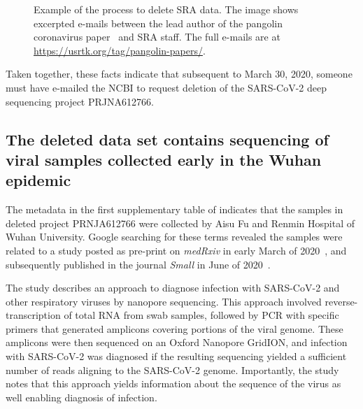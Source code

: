 \documentclass[9pt,twocolumn,twoside]{gsajnl_modified}
\begin{document}
\begin{figure}[]
\centering
{}
\caption{Example of the process to delete SRA data.
The image shows excerpted e-mails between the lead author of the pangolin coronavirus paper~\citep{xiao2020isolation} and SRA staff.
The full e-mails are at \url{https://usrtk.org/tag/pangolin-papers/}.
}
\label{fig:pangolin_emails}
\end{figure}

Taken together, these facts indicate that subsequent to March 30, 2020, someone must have e-mailed the NCBI to request deletion of the SARS-CoV-2 deep sequencing project PRJNA612766.

\subsection{The deleted data set contains sequencing of viral samples collected early in the Wuhan epidemic}
The metadata in the first supplementary table of \citet{farkas2020insights} indicates that the samples in deleted project PRNJA612766 were collected by Aisu Fu and Renmin Hospital of Wuhan University.
Google searching for these terms revealed the samples were related to a study posted as pre-print on \textit{medRxiv} in early March of 2020~\citep{Wang2020medRxiv}, and subsequently published in the journal \textit{Small} in June of 2020~\citep{Wang2020small}.

The study describes an approach to diagnose infection with SARS-CoV-2 and other respiratory viruses by nanopore sequencing.
This approach involved reverse-transcription of total RNA from swab samples, followed by PCR with specific primers that generated amplicons covering portions of the viral genome.
These amplicons were then sequenced on an Oxford Nanopore GridION, and infection with SARS-CoV-2 was diagnosed if the resulting sequencing yielded a sufficient number of reads aligning to the SARS-CoV-2 genome.
Importantly, the study notes that this approach yields information about the sequence of the virus as well enabling diagnosis of infection.
\end{document}
